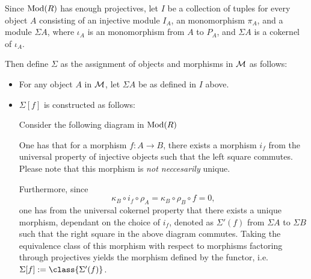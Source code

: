 \begin{definition}
    \label{def:stmod_sigma}
    Since \( \operatorname{Mod}(R) \) has enough projectives, let \( I \) be a collection of tuples for every object \( A \) consisting of an injective module \( I_A \), an monomorphism \( \pi_A \), and a module \( \Sigma A \), where \( \iota_A \) is an monomorphism from \( A \) to \( P_A \), and \( \Sigma A \) is a cokernel of \( \iota_A \).

    Then define \( \Sigma \) as the assignment of objects and morphisms in \( {\mathcal{M}} \) as follows:
    \begin{itemize}
        \item {
            For any object \( A \) in \( {\mathcal{M}} \), let \( \Sigma A \) be as defined in \( I \) above.
        }
        \item {
            \( \Sigma [f] \) is constructed as follows:

            Consider the following diagram in \( \operatorname{Mod}(R) \)
            \begin{center}
            \end{center}

            One has that for a morphism \( f: A \to B \), there exists a morphism \( i_f \) from the universal property of injective objects such that the left square commutes. Please note that this morphism is \emph{not neccesarily} unique.

            Furthermore, since
            \[
                \kappa_B \circ i_f \circ \rho_A = \kappa_B \circ \rho_B \circ f = 0,
            \]
            one has from the universal cokernel property that there exists a unique morphism, dependant on the choice of \( i_f \), denoted as \( \Sigma'(f) \) from \( \Sigma A \) to \( \Sigma B \) such that the right square in the above diagram commutes. Taking the equivalence class of this morphism with respect to morphisms factoring through projectives yields the morphism defined by the functor, i.e. \( \Sigma [f] := \class{\Sigma'(f)} \).
        }
    \end{itemize}
\end{definition}


